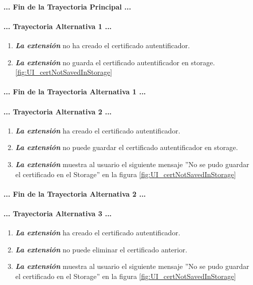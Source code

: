 \documentclass[12pt, a4paper, titlepage]{report}
\begin{document}
				\paragraph{... Fin de la Trayectoria Principal ...}
				
				\paragraph{... Trayectoria Alternativa 1 ...}
				\begin{enumerate}
				    \item \textbf{\textit{La extensión}} no ha creado el certificado autentificador.
					\item \textbf{\textit{La extensión}} no guarda el certificado autentificador en storage. 
					 \ref{fig:UI_certNotSavedInStorage}
				\end{enumerate}
				\paragraph{... Fin de la Trayectoria Alternativa 1 ...}
				
				\paragraph{... Trayectoria Alternativa 2 ...}
				\begin{enumerate}
				    \item \textbf{\textit{La extensión}} ha creado  el certificado autentificador.
					\item \textbf{\textit{La extensión}} no puede guardar el certificado autentificador en storage. 
					\item \textbf{\textit{La extensión}} muestra al usuario el siguiente mensaje ''No se pudo guardar el certificado en el Storage'' en la figura \ref{fig:UI_certNotSavedInStorage}
				\end{enumerate}
				\paragraph{... Fin de la Trayectoria Alternativa 2 ...}
				
				\paragraph{... Trayectoria Alternativa 3 ...}
				\begin{enumerate}
				    \item \textbf{\textit{La extensión}} ha creado  el certificado autentificador.
					\item \textbf{\textit{La extensión}} no puede eliminar el certificado anterior.
					\item \textbf{\textit{La extensión}} muestra al usuario el siguiente mensaje ''No se pudo guardar el certificado en el Storage'' en la figura
					 \ref{fig:UI_certNotSavedInStorage}
				\end{enumerate}
\end{document}
